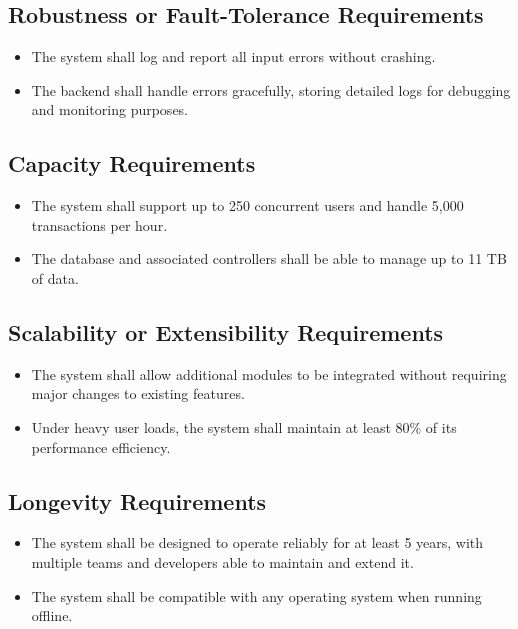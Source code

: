 \documentclass[12pt]{article}
\begin{document}
\subsection{Robustness or Fault-Tolerance Requirements}
\begin{itemize}
    \item The system shall log and report all input errors without crashing.
    \item The backend shall handle errors gracefully, storing detailed logs for debugging and monitoring purposes.
\end{itemize}

\subsection{Capacity Requirements}
\begin{itemize}
    \item The system shall support up to 250 concurrent users and handle 5,000 transactions per hour.
    \item The database and associated controllers shall be able to manage up to 11 TB of data.
\end{itemize}

\subsection{Scalability or Extensibility Requirements}
\begin{itemize}
    \item The system shall allow additional modules to be integrated without requiring major changes to existing features.
    \item Under heavy user loads, the system shall maintain at least 80\% of its performance efficiency.
\end{itemize}

\subsection{Longevity Requirements}
\begin{itemize}
    \item The system shall be designed to operate reliably for at least 5 years, with multiple teams and developers able to maintain and extend it.
    \item The system shall be compatible with any operating system when running offline.
\end{itemize}
\end{document}
